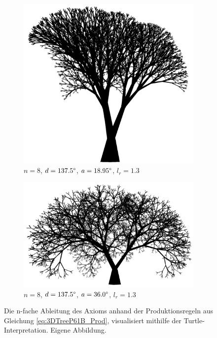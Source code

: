	\cite[S.60]{ABOP:04} 
\begin{figure} [hbtp]
	\centering
	\begin{subfigure}[t]{.7\textwidth}
		\centering
		\includegraphics[width=\linewidth]{images/3DTreeP61B_Angle_18_95.png}
		\caption{$n=8$, $d=137.5\degree$, $a=18.95\degree$, $l_r=1.3$}
		\label{fig:3DTreeP61B_Angle_18_95}
	\end{subfigure}
	\begin{subfigure}[t]{.7\textwidth}
		\centering
		\includegraphics[width=\linewidth]{images/3DTreeP61B_Angle_36.png}
		\caption{$n=8$, $d=137.5\degree$, $a=36.0\degree$, $l_r=1.3$}
		\label{fig:3DTreeP61B_Angle_36}
	\end{subfigure}
	\caption{Die n-fache Ableitung des Axioms anhand der Produktionsregeln aus Gleichung \ref{eq:3DTreeP61B_Prod}, visualisiert mithilfe der Turtle-Interpretation. Eigene Abbildung.}
	\label{fig:BranchingLSystems}
\end{figure}